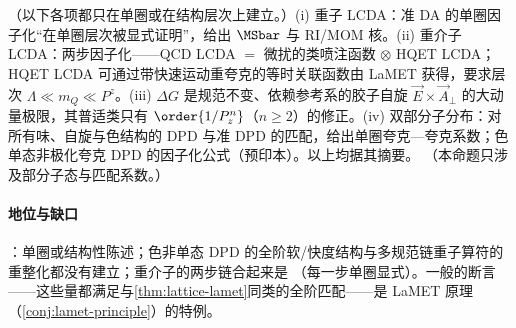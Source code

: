 \begin{proposition}\label{prop:lamet-other-objects}
（以下各项都只在单圈或在结构层次上建立。）(i) 重子 LCDA：准 DA 的单圈因子化“在单圈层次被显式证明”，给出 $\MSbar$ 与 RI/MOM 核\cite{Deng:2023csv}。(ii) 重介子 LCDA：两步因子化——QCD LCDA $=$ 微扰的类喷注函数 $\otimes$ HQET LCDA\cite{Beneke:2023nmj}；HQET LCDA 可通过带快速运动重夸克的等时关联函数由 LaMET 获得\cite{Han:2024fkr}，要求层次 $\Lambda\ll m_Q\ll P^z$。(iii) $\Delta G$ 是规范不变、依赖参考系的胶子自旋 $\vec E\times\vec A_\perp$ 的大动量极限\cite{Ji:2013fga}，其普适类只有 $\order{1/P_z^n}$（$n\ge2$）的修正\cite{Hatta:2013gta}。(iv) 双部分子分布：对所有味、自旋与色结构的 DPD 与准 DPD 的匹配，给出单圈夸克—夸克系数\cite{Jaarsma:2023woo}；色单态非极化夸克 DPD 的因子化公式\cite{Zhang:2023wea}（预印本）。以上均据其摘要。
（本命题只涉及部分子态与匹配系数。）
\end{proposition}

\paragraph{地位与缺口}
\tagP：单圈或结构性陈述；色非单态 DPD 的全阶软/快度结构与多规范链重子算符的重整化都没有建立；重介子的两步链合起来是 \tagP（每一步单圈显式）。一般的断言——这些量都满足与\cref{thm:lattice-lamet}同类的全阶匹配——是 LaMET 原理（\cref{conj:lamet-principle}）的特例。

